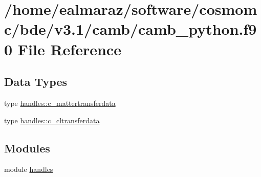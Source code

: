 \hypertarget{camb__python_8f90}{}\section{/home/ealmaraz/software/cosmomc/bde/v3.1/camb/camb\+\_\+python.f90 File Reference}
\label{camb__python_8f90}
\subsection*{Data Types}
\begin{DoxyCompactItemize}
\item 
type \mbox{\hyperlink{structhandles_1_1c__mattertransferdata}{handles\+::c\+\_\+mattertransferdata}}
\item 
type \mbox{\hyperlink{structhandles_1_1c__cltransferdata}{handles\+::c\+\_\+cltransferdata}}
\end{DoxyCompactItemize}
\subsection*{Modules}
\begin{DoxyCompactItemize}
\item 
module \mbox{\hyperlink{namespacehandles}{handles}}
\end{DoxyCompactItemize}

